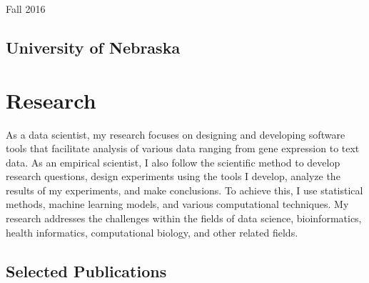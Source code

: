 \documentclass[11pt,a4paper]{moderncv}
\begin{document}

{Fall 2016}{}{}{}


\subsection{\textbf{University of Nebraska}}





\vspace{1.0cm}
\section{\textbf{Research}} %
\vspace{-.4cm}


As a data scientist, my research focuses on designing and developing software tools that facilitate analysis of various data ranging from gene expression to text data. As an empirical scientist, I also follow the scientific method to develop research questions, design experiments using the tools I develop, analyze the results of my experiments, and make conclusions. To achieve this, I use statistical methods, machine learning models, and various computational techniques.  My research addresses the challenges within the fields of data science,  bioinformatics, health informatics,  computational biology, and other related fields. 

\subsection{\textbf{Selected Publications}}
\vspace{-.4cm}
\end{document}
